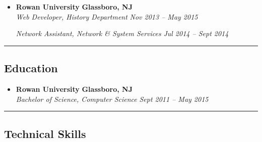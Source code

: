 \begin{itemize}
  \item
  \headerrow
    {\textbf{Rowan University}}
    {\textbf{Glassboro, NJ}}
  \\
  \headerrow
    {\emph{Web Developer, History Department}}
    {\emph{Nov 2013 -- May 2015}}
  \headerrow
    {\emph{Network Assistant, Network \& System Services}}
    {\emph{Jul 2014 -- Sept 2014}}

\end{itemize}

\hrule
\vspace{-0.4em}
\subsection*{Education}

\begin{itemize}
  \parskip=0.1em

  \item 
  \headerrow
    {\textbf{Rowan University}}
    {\textbf{Glassboro, NJ}}
  \\
  \headerrow
    {\emph{Bachelor of Science, Computer Science}}
    {\emph{Sept 2011 -- May 2015}}

\end{itemize}

\hrule
\vspace{-0.4em}
\subsection*{Technical Skills}

